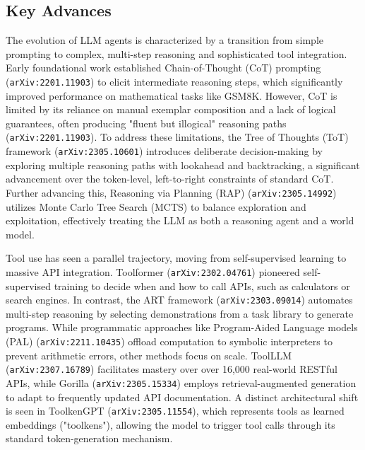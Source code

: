 \documentclass[11pt]{article}
\begin{document}
\subsection{Key Advances}

The evolution of LLM agents is characterized by a transition from simple prompting to complex, multi-step reasoning and sophisticated tool integration. Early foundational work established Chain-of-Thought (CoT) prompting (\texttt{arXiv:2201.11903}) to elicit intermediate reasoning steps, which significantly improved performance on mathematical tasks like GSM8K. However, CoT is limited by its reliance on manual exemplar composition and a lack of logical guarantees, often producing "fluent but illogical" reasoning paths (\texttt{arXiv:2201.11903}). To address these limitations, the Tree of Thoughts (ToT) framework (\texttt{arXiv:2305.10601}) introduces deliberate decision-making by exploring multiple reasoning paths with lookahead and backtracking, a significant advancement over the token-level, left-to-right constraints of standard CoT. Further advancing this, Reasoning via Planning (RAP) (\texttt{arXiv:2305.14992}) utilizes Monte Carlo Tree Search (MCTS) to balance exploration and exploitation, effectively treating the LLM as both a reasoning agent and a world model.

Tool use has seen a parallel trajectory, moving from self-supervised learning to massive API integration. Toolformer (\texttt{arXiv:2302.04761}) pioneered self-supervised training to decide when and how to call APIs, such as calculators or search engines. In contrast, the ART framework (\texttt{arXiv:2303.09014}) automates multi-step reasoning by selecting demonstrations from a task library to generate programs. While programmatic approaches like Program-Aided Language models (PAL) (\texttt{arXiv:2211.10435}) offload computation to symbolic interpreters to prevent arithmetic errors, other methods focus on scale. ToolLLM (\texttt{arXiv:2307.16789}) facilitates mastery over over 16,000 real-world RESTful APIs, while Gorilla (\texttt{arXiv:2305.15334}) employs retrieval-augmented generation to adapt to frequently updated API documentation. A distinct architectural shift is seen in ToolkenGPT (\texttt{arXiv:2305.11554}), which represents tools as learned embeddings ("toolkens"), allowing the model to trigger tool calls through its standard token-generation mechanism.
\end{document}
